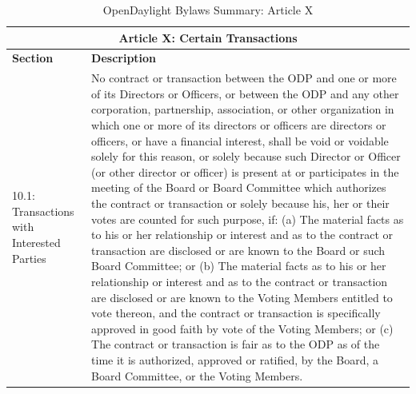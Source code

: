 \documentclass[a4paper, 12pt]{book}
\begin{document}
\begin{table}[H]
  \begin{center}
    \begin{tabular}{ | p{4cm} | p{11cm} | }
    \toprule
    \multicolumn {2}{|c|}{\textbf{Article X: Certain Transactions}} \\
    \hline
    \textbf{Section} & \textbf{Description} \\
    \hline
    10.1: Transactions with Interested Parties & No contract or transaction between the ODP and one or more of its Directors or Officers, or between the ODP and any other corporation, partnership, association, or other organization in which one or more of its directors or officers are directors or officers, or have a financial interest, shall be void or voidable solely for this reason, or solely because such Director or Officer (or other director or officer) is present at or participates in the meeting of the Board or Board Committee which authorizes the contract or transaction or solely because his, her or their votes are counted for such purpose, if: (a) The material facts as to his or her relationship or interest and as to the contract or transaction are disclosed or are known to the Board or such Board Committee; or (b) The material facts as to his or her relationship or interest and as to the contract or transaction are disclosed or are known to the Voting Members entitled to vote thereon, and the contract or transaction is specifically approved in good faith by vote of the Voting Members; or (c)  The contract or transaction is fair as to the ODP as of the time it is authorized, approved or ratified, by the Board, a Board Committee, or the Voting Members.\\
    \bottomrule
    \end{tabular}
    \caption{OpenDaylight Bylaws Summary: Article X}
    \label{tab:odlbylaws-art10}
  \end{center}
\end{table}
\end{document}
